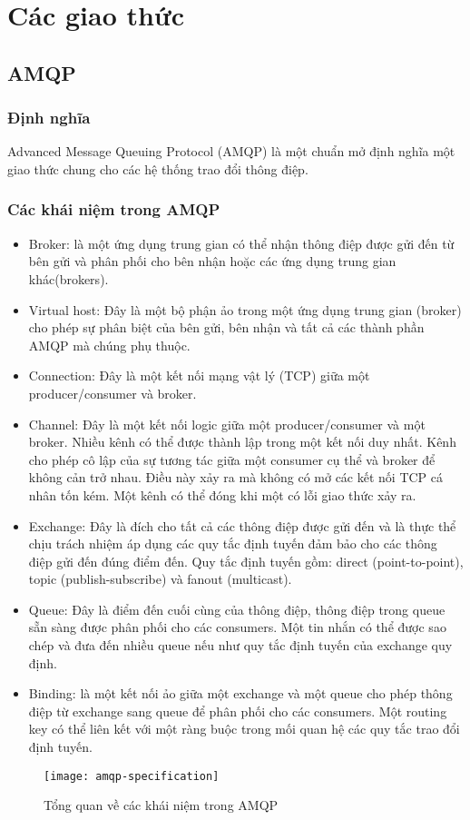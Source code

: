 \section{Các giao thức}
\subsection{AMQP}
\subsubsection{Định nghĩa}
Advanced Message Queuing Protocol (AMQP) là một chuẩn mở định nghĩa một giao thức chung cho các hệ thống trao đổi thông điệp.
\subsubsection{Các khái niệm trong AMQP}
\begin{itemize}
	\item Broker: là một ứng dụng trung gian có thể nhận thông điệp được gửi đến từ bên gửi và phân phối cho bên nhận hoặc các ứng dụng trung gian khác(brokers).
	\item Virtual host: Đây là một bộ phận ảo trong một ứng dụng trung gian (broker) cho phép sự phân biệt của bên gửi, bên nhận và tất cả các thành phần AMQP mà chúng phụ thuộc.
	\item Connection: Đây là một kết nối mạng vật lý (TCP) giữa một
producer/consumer và broker.
	\item Channel: Đây là một kết nối logic giữa một producer/consumer và một broker. Nhiều kênh có thể được thành lập trong một kết nối duy nhất. Kênh cho phép cô lập của sự tương tác giữa một consumer cụ thể và broker để không cản trở nhau. Điều này xảy ra mà không có mở các kết nối TCP cá nhân tốn kém. Một kênh có thể đóng khi một có lỗi giao thức xảy ra.
	\item Exchange: Đây là đích cho tất cả các thông điệp được gửi đến và là thực thể chịu trách nhiệm áp dụng các quy tắc định tuyến đảm bảo cho các thông điệp gửi đến đúng điểm đến. Quy tắc định tuyến gồm: direct (point-to-point), topic (publish-subscribe) và fanout (multicast).
	\item Queue: Đây là điểm đến cuối cùng của thông điệp, thông điệp trong queue sẵn sàng được phân phối cho các consumers. Một tin nhắn có thể được sao chép và đưa đến nhiều queue nếu như quy tắc định tuyến của exchange quy định.
	\item Binding: là một kết nối ảo giữa một exchange và một queue cho phép thông điệp từ exchange sang queue để phân phối cho các consumers. Một routing key có thể liên kết với một ràng buộc trong mối quan hệ các quy tắc trao đổi định tuyến.
\end{itemize}
\begin{figure}[h]
    \centering
    \texttt{[image: amqp-specification]}
    \caption{Tổng quan về các khái niệm trong AMQP}
    \label{fig:mesh1}
\end{figure}

